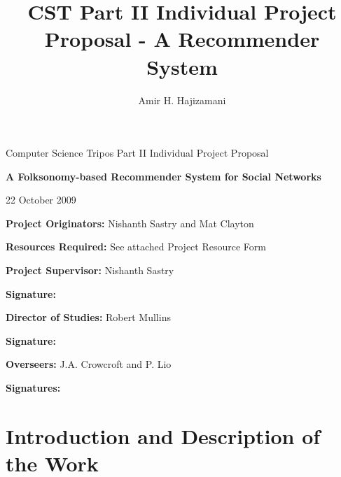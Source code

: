 
\author{Amir H. Hajizamani}
\title{CST Part II Individual Project Proposal - A Recommender System}


\newcommand{\al}{$<$}
\newcommand{\ar}{$>$}

\parindent 0pt
\parskip 6pt

\thispagestyle{empty}

\medskip
{}
\medskip
{}

\vfill

\centerline{\large Computer Science Tripos Part II Individual Project Proposal}
\vspace{0.4in}
\centerline{\Large\bf A Folksonomy-based Recommender System for Social Networks}
\vspace{0.3in}
\centerline{\large{22 October 2009}}

\vfill

{\bf Project Originators:} Nishanth Sastry and Mat Clayton

\vspace{0.1in}

{\bf Resources Required:} See attached Project Resource Form

\vspace{0.5in}

{\bf Project Supervisor:} Nishanth Sastry

\vspace{0.2in}

{\bf Signature:}

\vspace{0.5in}

{\bf Director of Studies:} Robert Mullins

\vspace{0.2in}

{\bf Signature:}

\vspace{0.5in}

{\bf Overseers:} J.A. Crowcroft and P. Lio

\vspace{0.2in}

{\bf Signatures:}

\vfill
\eject


\section{Introduction and Description of the Work}

